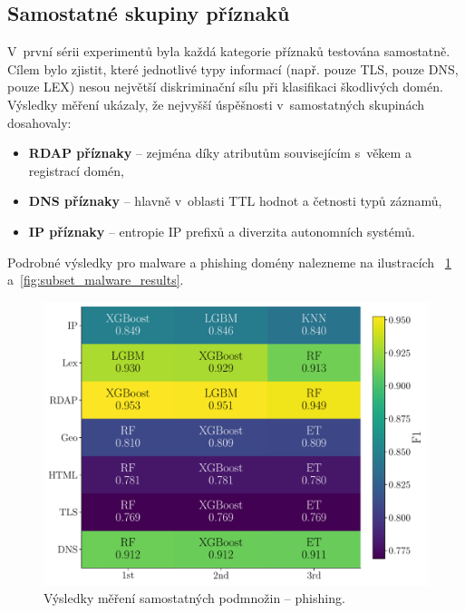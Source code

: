 \subsection{Samostatné skupiny příznaků}
\label{subsection:standalone_res}

V~první sérii experimentů byla každá kategorie příznaků testována samostatně. Cílem bylo zjistit, které jednotlivé typy informací (např. pouze TLS, pouze DNS, pouze LEX) nesou největší diskriminační sílu při klasifikaci škodlivých domén. Výsledky měření ukázaly, že nejvyšší úspěšnosti v~samostatných skupinách dosahovaly:
\begin{itemize}
    \item \textbf{RDAP příznaky} – zejména díky atributům souvisejícím s~věkem a registrací domén,
    \item \textbf{DNS příznaky} – hlavně v~oblasti TTL hodnot a četnosti typů záznamů,
    \item \textbf{IP příznaky} – entropie IP prefixů a diverzita autonomních systémů.
\end{itemize}

Podrobné výsledky pro malware a phishing domény nalezneme na ilustracích ~\ref{fig:subset_phish_results} a~\ref{fig:subset_malware_results}.


\begin{figure}[!h]
    \centering
    \includegraphics[width=\textwidth]{obrazky-figures/base_phishing.pdf}
    \caption{Výsledky měření samostatných podmnožin – phishing.}
    \label{fig:subset_phish_results}
\end{figure}

